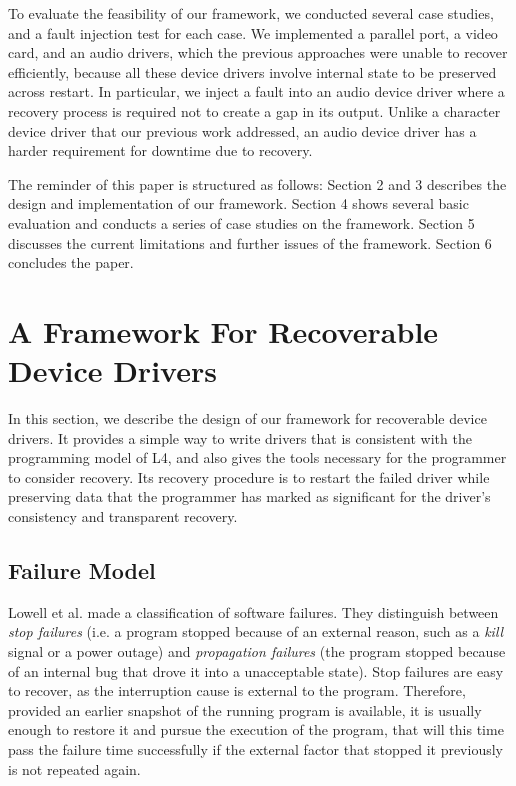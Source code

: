 \documentclass{report}
\begin{document}
To evaluate the feasibility of our framework, we conducted several case studies, and a fault injection test for each case.  We implemented a parallel port, a video card, and an audio drivers, which the previous approaches were unable to recover efficiently, because all these device drivers involve internal state to be preserved across restart.  In particular, we inject a fault into an audio device driver where a recovery process is required not to create a gap in its output.  Unlike a character device driver that our previous work addressed, an audio device driver has a harder requirement for downtime due to recovery.

The reminder of this paper is structured as follows:  Section 2 and 3 describes the design and implementation of our framework.  Section 4 shows several basic evaluation and conducts a series of case studies on the framework.  Section 5 discusses the current limitations and further issues of the framework.  Section 6 concludes the paper.


\section{A Framework For Recoverable Device Drivers}
\label{s:design}

In this section, we describe the design of our framework for recoverable device drivers. It provides a simple way to write drivers that is consistent with the programming model of L4, and also gives the tools necessary for the programmer to consider recovery. Its recovery procedure is to restart the failed driver while preserving data that the programmer has marked as significant for the driver's consistency and transparent recovery.

\subsection{Failure Model}

Lowell et al. \cite{Lowell2000} made a classification of software failures. They distinguish between \emph{stop failures} (i.e. a program stopped because of an external reason, such as a \emph{kill} signal or a power outage) and \emph{propagation failures} (the program stopped because of an internal bug that drove it into a unacceptable state). Stop failures are easy to recover, as the interruption cause is external to the program. Therefore, provided an earlier snapshot of the running program is available, it is usually enough to restore it and pursue the execution of the program, that will this time pass the failure time successfully if the external factor that stopped it previously is not repeated again.
\end{document}
